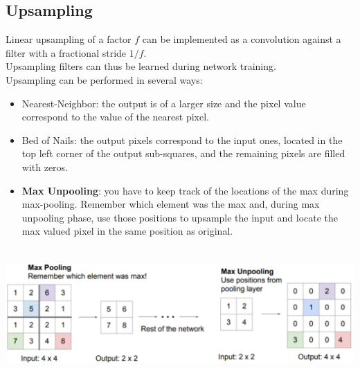 \subsection{Upsampling}
Linear upsampling of a factor $f$ can be implemented as a convolution against a filter with a fractional stride $1/f$. \\
Upsampling filters can thus be learned during network training. \\
Upsampling can be performed in several ways: 
\begin{itemize}
    \item Nearest-Neighbor: the output is of a larger size and the pixel value correspond to the value of the nearest pixel.
    \item Bed of Nails: the output pixels correspond to the input ones, located in the top left corner of the output sub-squares, and the remaining pixels are filled with zeros.
    \item \textbf{Max Unpooling}: you have to keep track of the locations of the max during max-pooling. Remember which element was the max and, during max unpooling phase, use those positions to upsample the input and locate the max valued pixel in the same position as original.
\end{itemize}{}

\begin{minipage}{\linewidth}
        \centering
        \includegraphics[width=15cm, height=5cm]{images/max_pooling.png}
        \label{fig:log_arch}
\end{minipage} \\

